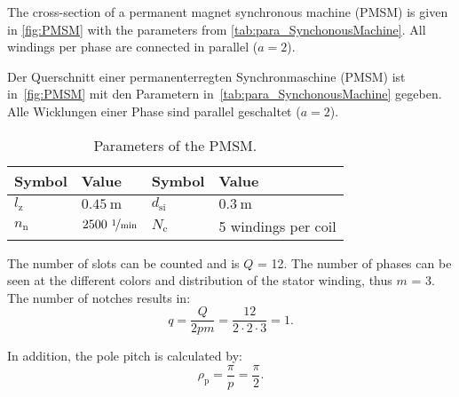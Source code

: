 

The cross-section of a permanent magnet synchronous machine (PMSM) is given in \autoref{fig:PMSM} with the parameters from \autoref{tab:para_SynchonousMachine}. All windings per phase are connected in parallel ($a = 2$).


\begin{germanblock}
    Der Querschnitt einer permanenterregten Synchronmaschine (PMSM) ist in~\autoref{fig:PMSM} mit den Parametern in~\autoref{tab:para_SynchonousMachine} gegeben. Alle Wicklungen einer Phase sind parallel geschaltet ($a = 2$).
\end{germanblock}



\begin{table}[htb]
    \caption{Parameters of the PMSM.}
    \centering
    \begin{tabular}{llll}\toprule
        Symbol           & Value                             & Symbol            & Value               \\
        \midrule
        $l_{\mathrm{z}}$ & $\SI{0.45}{\metre}$               & $d_{\mathrm{si}}$ & $\SI{0.3}{\metre}$  \\
        $n_{\mathrm{n}}$ & $2500~\nicefrac{1}{\mathrm{min}}$ & $N_{\mathrm{c}}$  & 5 windings per coil \\
        \bottomrule
    \end{tabular}
    \label{tab:para_SynchonousMachine}
\end{table}




\begin{solutionblock}
    The number of slots can be counted and is $Q$ = 12. The number of phases can be seen at the different colors and distribution of the stator winding, thus $m$ = 3. The number of notches results in:
    $$
        q = \frac{Q}{2pm} = \frac{12}{2\cdot 2\cdot 3} = 1.
    $$

    In addition, the pole pitch is calculated by:
    $$
        \rho_{\mathrm{p}} = \frac{\pi}{p} = \frac{\pi}{2}.
    $$


\end{solutionblock}

